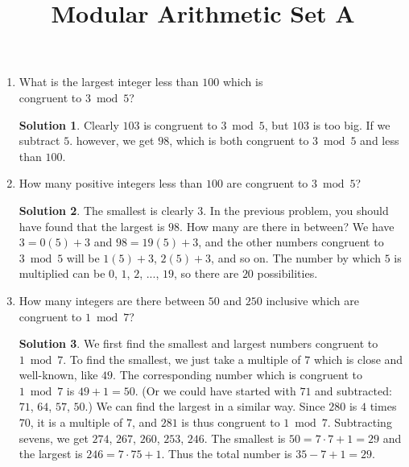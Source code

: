 \documentclass{article}
\title{Modular Arithmetic Set A}
\author{}
\date{}
\theoremstyle{definition}
\newtheorem*{solution}{Solution}
\begin{document}
\maketitle
\begin{multicols}{2}
    \begin{enumerate}
        \item What is the largest integer less than $100$ which is \\ congruent to $3\bmod 5$?
            \begin{solution}
                Clearly $103$ is congruent to $3 \bmod{5}$, but $103$ is too big. 
                If we subtract $5$. however, we get $98$, which is both congruent to $3 \bmod{5}$ and less than $100$. 
            \end{solution}
        \item How many positive integers less than $100$ are congruent to $3\bmod 5$?
            \begin{solution}
                The smallest is clearly $3$. In the previous problem, you should have found that the largest is $98$. 
                How many are there in between? 
                We have $3 = 0(5) + 3$ and $98 = 19(5) +3$, and the other numbers congruent to $3 \bmod{5}$ will be $1(5) + 3$, $2(5) + 3$, and so on. 
                The number by which $5$ is multiplied can be $0$, $1$, $2$, ..., $19$, so there are $20$ possibilities.
            \end{solution}
        \item How many integers are there between $50$ and $250$ inclusive which are congruent to $1\bmod 7$?
            \begin{solution}
                We first find the smallest and largest numbers congruent to $1 \bmod{7}$. 
                To find the smallest, we just take a multiple of $7$ which is close and well-known, like $49$. 
                The corresponding number which is congruent to $1 \bmod{7}$ is $49 + 1 = 50$. 
                (Or we could have started with $71$ and subtracted: $71$, $64$, $57$, $50$.) 
                We can find the largest in a similar way. 
                Since $280$ is $4$ times $70$, it is a multiple of $7$, and $281$ is thus congruent to $1 \bmod{7}$. 
                Subtracting sevens, we get $274$, $267$, $260$, $253$, $246$. 
                The smallest is $50 = 7 \cdot 7 + 1 = 29$ and the largest is $246 = 7 \cdot 75 + 1$. 
                Thus the total number is $35 - 7 + 1 = 29$.
            \end{solution}

\end{enumerate}
\end{multicols}
\end{document}
